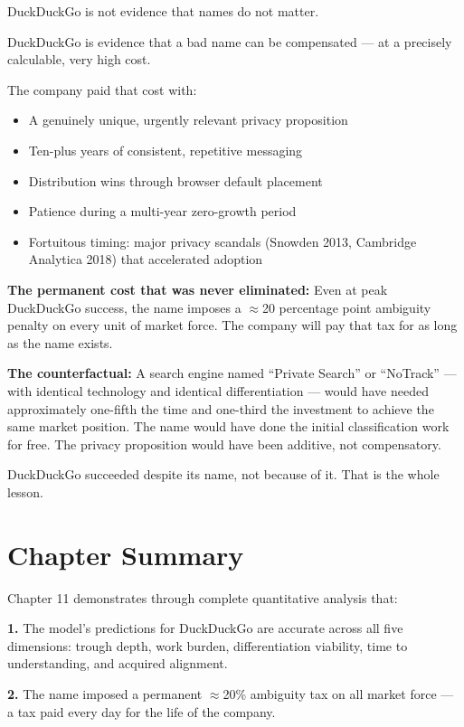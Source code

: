 \documentclass[12pt, openany]{book}
\theoremstyle{thmstyle}
\theoremstyle{defstyle}
\begin{document}
\begin{keybox}
DuckDuckGo is not evidence that names do not matter.

DuckDuckGo is evidence that a bad name can be compensated --- at a precisely calculable, very high cost.

The company paid that cost with:
\begin{itemize}[leftmargin=1.5em]
  \item A genuinely unique, urgently relevant privacy proposition
  \item Ten-plus years of consistent, repetitive messaging
  \item Distribution wins through browser default placement
  \item Patience during a multi-year zero-growth period
  \item Fortuitous timing: major privacy scandals (Snowden 2013, Cambridge Analytica 2018) that accelerated adoption
\end{itemize}

\textbf{The permanent cost that was never eliminated:} Even at peak DuckDuckGo success, the name imposes a $\approx$20 percentage point ambiguity penalty on every unit of market force. The company will pay that tax for as long as the name exists.

\textbf{The counterfactual:} A search engine named ``Private Search'' or ``NoTrack'' --- with identical technology and identical differentiation --- would have needed approximately one-fifth the time and one-third the investment to achieve the same market position. The name would have done the initial classification work for free. The privacy proposition would have been additive, not compensatory.

DuckDuckGo succeeded despite its name, not because of it. That is the whole lesson.
\end{keybox}

\section{Chapter Summary}

Chapter 11 demonstrates through complete quantitative analysis that:

\textbf{1.} The model's predictions for DuckDuckGo are accurate across all five dimensions: trough depth, work burden, differentiation viability, time to understanding, and acquired alignment.

\textbf{2.} The name imposed a permanent $\approx$20\% ambiguity tax on all market force --- a tax paid every day for the life of the company.
\end{document}
